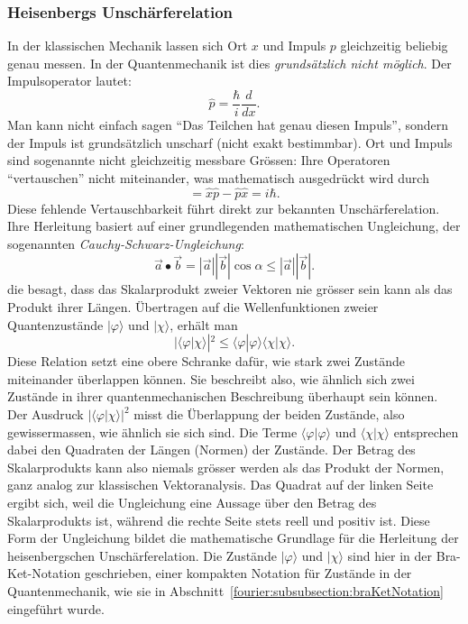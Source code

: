 	\subsubsection{Heisenbergs Unschärferelation%
	\label{fourier:subsubsection:unschaerferelation}}
		In der klassischen Mechanik lassen sich Ort $x$ und Impuls $p$ gleichzeitig beliebig genau messen.
		In der Quantenmechanik ist dies \emph{grundsätzlich nicht möglich}.
		Der Impulsoperator lautet:
		\begin{equation}
			\hat{p} = \frac{\hbar}{i} \frac{d}{dx}.
		\end{equation}
		Man kann nicht einfach sagen ``Das Teilchen hat genau diesen Impuls'', sondern der Impuls ist grundsätzlich unscharf (nicht exakt bestimmbar).
		Ort und Impuls sind sogenannte nicht gleichzeitig messbare Grössen:
		Ihre Operatoren ``vertauschen'' nicht miteinander, was mathematisch ausgedrückt wird durch
		\begin{equation}
			[\hat{x},\hat{p}] = \hat{x} \hat{p} - \hat{p} \hat{x} = i \hbar.
		\end{equation}
		Diese fehlende Vertauschbarkeit führt direkt zur bekannten Unschärferelation.
		Ihre Herleitung basiert auf einer grundlegenden mathematischen Ungleichung, der sogenannten \emph{Cauchy-Schwarz-Ungleichung}:
		\begin{equation}\label{fourier:equation:CauchySchwarzUngleichung}
			\vec{a} \bullet \vec{b} = |\vec{a}| |\vec{b}|\cos\alpha \le |\vec{a}| |\vec{b}|.
		\end{equation}
		die besagt, dass das Skalarprodukt zweier Vektoren nie grösser sein kann als das Produkt ihrer Längen.
		Übertragen auf die Wellenfunktionen zweier Quantenzustände $|\varphi\rangle$ und $|\chi\rangle$, erhält man
		\begin{equation}
			|\langle\varphi | \chi\rangle|^2 \le \langle\varphi | \varphi\rangle \langle\chi | \chi\rangle.
		\end{equation}
		Diese Relation setzt eine obere Schranke dafür, wie stark zwei Zustände miteinander überlappen können. Sie beschreibt also, wie ähnlich sich zwei Zustände in ihrer quantenmechanischen Beschreibung überhaupt sein können.
		Der Ausdruck $|\langle\varphi|\chi\rangle|^2$ misst die Überlappung der beiden Zustände, also gewissermassen, wie ähnlich sie sich sind.
		Die Terme $\langle\varphi|\varphi\rangle$ und $\langle\chi|\chi\rangle$ entsprechen dabei den Quadraten der Längen (Normen) der Zustände.
		Der Betrag des Skalarprodukts kann also niemals grösser werden als das Produkt der Normen, ganz analog zur klassischen Vektoranalysis.
		Das Quadrat auf der linken Seite ergibt sich, weil die Ungleichung eine Aussage über den Betrag des Skalarprodukts ist, während die rechte Seite stets reell und positiv ist.
		Diese Form der Ungleichung bildet die mathematische Grundlage für die Herleitung der heisenbergschen Unschärferelation.
		Die Zustände $|\varphi\rangle$ und $|\chi\rangle$ sind hier in der Bra-Ket-Notation geschrieben, einer kompakten Notation für Zustände in der Quantenmechanik, wie sie in Abschnitt~\ref{fourier:subsubsection:braKetNotation} eingeführt wurde.

